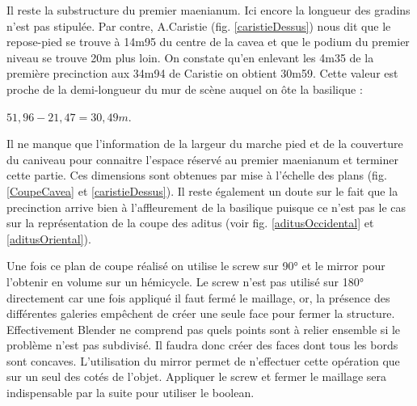 Il reste la substructure du premier maenianum. Ici encore la longueur des gradins n'est pas stipulée. Par contre, A.Caristie (fig. \ref{caristieDessus}) nous dit que le repose-pied se trouve à 14m95 du centre de la cavea et que le podium du premier niveau se trouve 20m plus loin. On constate qu'en enlevant les 4m35 de la première precinction aux 34m94 de Caristie on obtient 30m59. Cette valeur est proche de la demi-longueur du mur de scène auquel on ôte la basilique : 
\begin{center}
$51,96 - 21,47=30,49m$.
\end{center}

Il ne manque que l'information de la largeur du marche pied et de la couverture du caniveau pour connaitre l'espace réservé au premier maenianum et terminer cette partie. Ces dimensions sont obtenues par mise à l'échelle des plans (fig. \ref{CoupeCavea} et \ref{caristieDessus}). Il reste également un doute sur le fait que la precinction arrive bien à l'affleurement de la basilique puisque ce n'est pas le cas sur la représentation de la coupe des aditus (voir fig. \ref{aditusOccidental} et \ref{aditusOriental}).

Une fois ce plan de coupe réalisé on utilise le \gls{screw} sur 90° et le \gls{mirror} pour l'obtenir en volume sur un hémicycle. Le \gls{screw} n'est pas utilisé sur 180° directement car une fois appliqué il faut fermé le maillage, or, la présence des différentes galeries empêchent de créer une seule face pour fermer la structure. Effectivement Blender ne comprend pas quels points sont à relier ensemble si le problème n'est pas subdivisé. Il faudra donc créer des faces dont tous les bords sont concaves. L'utilisation du \gls{mirror} permet de n'effectuer cette opération que sur un seul des cotés de l'objet. Appliquer le \gls{screw} et fermer le maillage sera indispensable par la suite pour utiliser le \gls{boolean}.



